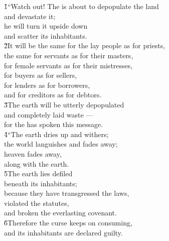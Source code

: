 \begin{poetry}
\poeml {}
\v{1}``Watch out! The  is about to depopulate the land \\
\poemll    and devastate it; \\
\poeml he will turn it upside down \\
\poemll    and scatter its inhabitants. \\
\poeml \v{2}It will be the same for the lay people as for priests, \\
\poemll    the same for servants as for their masters, \\
\poeml for female servants as for their mistresses, \\
\poemll    for buyers as for sellers, \\
\poeml for lenders as for borrowers, \\
\poemll    and for creditors as for debtors. \\
\poeml \v{3}The earth will be utterly depopulated \\
\poemll    and completely laid waste --- \\
\poemlll       for the  has spoken this message. \\
\poeml \v{4}``The earth dries up and withers; \\
\poemll    the world languishes and fades away; \\
\poeml heaven fades away, \\
\poemll    along with the earth. \\
\poeml \v{5}The earth lies defiled \\
\poemll    beneath its inhabitants; \\
\poeml because they have transgressed the laws, \\
\poeml violated the statutes, \\
\poeml and broken the everlasting covenant. \\
\poeml \v{6}Therefore the curse keeps on consuming, \\
\poemll    and its inhabitants are declared guilty. \\

\end{poetry}
